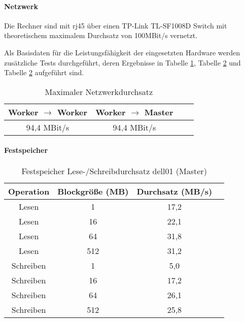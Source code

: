 \paragraph{Netzwerk}
Die Rechner sind mit \gls{rj45} über einen TP-Link TL-SF1008D Switch mit theoretischem maximalem Durchsatz von 100MBit/s vernetzt.

Als Basisdaten für die Leistungsfähigkeit der eingesetzten Hardware werden zusätzliche Tests durchgeführt, deren Ergebnisse in Tabelle \ref{table:network}, Tabelle \ref{table:master_harddrive} und Tabelle \ref{table:master_harddrive} aufgeführt sind.

\begin{table}[ht]
	\centering %
	\begin{tabular}{c c c c} %
	\hline\hline %
	Worker $\rightarrow$ Worker & Worker $\rightarrow$ Master \\ [0.5ex] %
	\hline %
	94,4 MBit/s & 94,4 MBit/s\\ [1ex] 
	\hline %
	\end{tabular}
	\caption{Maximaler Netzwerkdurchsatz{\protect\footnotemark}} %
	\label{table:network} %
\end{table}

\paragraph{Festspeicher}

\begin{table}[ht]
	\centering %
	\begin{tabular}{c c c c} %
	\hline\hline %
	Operation & Blockgröße (MB) & Durchsatz (MB/s) \\ [0.5ex] %
	\hline %
	Lesen & 1 & 17,2 \\ 
	Lesen & 16 & 22,1 \\
	Lesen & 64 & 31,8 \\
	Lesen & 512 & 31,2 \\
	Schreiben & 1 & 5,0 \\
	Schreiben & 16 & 17,2 \\
	Schreiben & 64 & 26,1 \\
	Schreiben & 512 & 25,8 \\[1ex] 
	\hline %
	\end{tabular}
	\caption{Festspeicher Lese-/Schreibdurchsatz dell01 (Master){\protect\footnotemark}} %
	\label{table:master_harddrive} %
\end{table}

